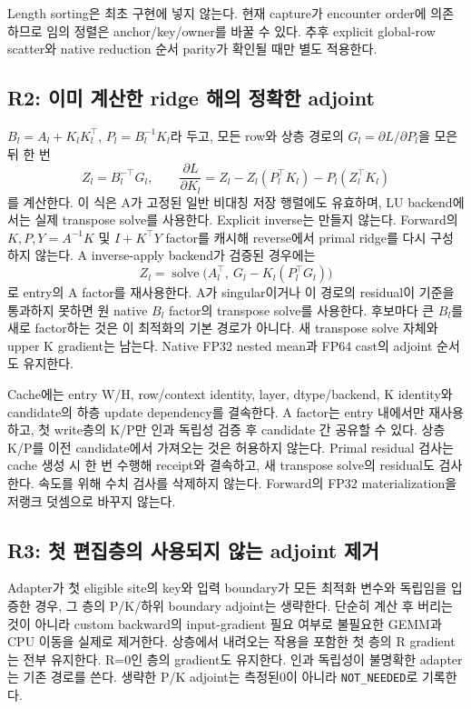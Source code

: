 \documentclass[11pt]{article}
\begin{document}
Length sorting은 최초 구현에 넣지 않는다. 현재 capture가 encounter order에 의존하므로
임의 정렬은 anchor/key/owner를 바꿀 수 있다. 추후 explicit global-row scatter와 native
reduction 순서 parity가 확인될 때만 별도 적용한다.

\subsection{R2: 이미 계산한 ridge 해의 정확한 adjoint}
$B_l=A_l+K_lK_l^\top$, $P_l=B_l^{-1}K_l$라 두고, 모든 row와 상층 경로의
$G_l=\partial L/\partial P_l$을 모은 뒤 한 번
\[
 Z_l=B_l^{-\top}G_l,\qquad
 \boxed{\frac{\partial L}{\partial K_l}
 =Z_l-Z_l(P_l^\top K_l)-P_l(Z_l^\top K_l)}
\]
를 계산한다. 이 식은 A가 고정된 일반 비대칭 저장 행렬에도 유효하며, LU backend에서는
실제 transpose solve를 사용한다. Explicit inverse는 만들지 않는다.
Forward의 $K,P,Y=A^{-1}K$ 및 $I+K^\top Y$ factor를 캐시해 reverse에서 primal
ridge를 다시 구성하지 않는다. A inverse-apply backend가 검증된 경우에는
\[
 Z_l=\operatorname{solve}\bigl(A_l^\top,\ G_l-K_l(P_l^\top G_l)\bigr)
\]
로 entry의 A factor를 재사용한다. A가 singular이거나 이 경로의 residual이 기준을
통과하지 못하면 원 native $B_l$ factor의 transpose solve를 사용한다.
후보마다 큰 $B_l$를 새로 factor하는 것은 이 최적화의 기본 경로가 아니다.
새 transpose solve 자체와 upper K gradient는 남는다.
Native FP32 nested mean과 FP64 cast의 adjoint 순서도 유지한다.

Cache에는 entry W/H, row/context identity, layer, dtype/backend, K identity와
candidate의 하층 update dependency를 결속한다. A factor는 entry 내에서만 재사용하고,
첫 write층의 K/P만 인과 독립성 검증 후 candidate 간 공유할 수 있다.
상층 K/P를 이전 candidate에서 가져오는 것은 허용하지 않는다.
Primal residual 검사는 cache 생성 시 한 번 수행해 receipt와 결속하고,
새 transpose solve의 residual도 검사한다. 속도를 위해 수치 검사를 삭제하지 않는다.
Forward의 FP32 materialization을 저랭크 덧셈으로 바꾸지 않는다.

\subsection{R3: 첫 편집층의 사용되지 않는 adjoint 제거}
Adapter가 첫 eligible site의 key와 입력 boundary가 모든 최적화 변수와 독립임을
입증한 경우, 그 층의 P/K/하위 boundary adjoint는 생략한다. 단순히 계산 후 버리는
것이 아니라 custom backward의 input-gradient 필요 여부로 불필요한 GEMM과 CPU 이동을
실제로 제거한다. 상층에서 내려오는 작용을 포함한 첫 층의 R gradient는 전부 유지한다.
R=0인 층의 gradient도 유지한다. 인과 독립성이 불명확한 adapter는 기존 경로를 쓴다.
생략한 P/K adjoint는 측정된0이 아니라 \texttt{NOT\_NEEDED}로 기록한다.
\end{document}

